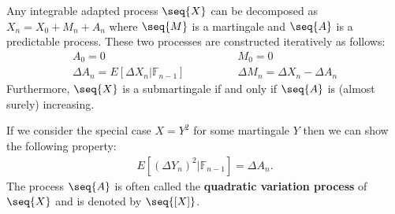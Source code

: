
    \begin{theorem}
        Any integrable adapted process $\seq{X}$ can be decomposed as $X_n=X_0+M_n+A_n$ where $\seq{M}$ is a martingale and $\seq{A}$ is a predictable process. These two processes are constructed iteratively as follows:
        \begin{align}
            A_0 = 0\qquad&\qquad M_0 = 0\\
            \Delta A_n = E[\Delta X_n|\mathbb{F}_{n-1}]\qquad&\qquad\Delta M_n = \Delta X_n - \Delta A_n
        \end{align}
        Furthermore, $\seq{X}$ is a submartingale if and only if $\seq{A}$ is (almost surely) increasing.
    \end{theorem}
    \begin{result}
        If we consider the special case $X=Y^2$ for some martingale $Y$ then we can show the following property:
        \begin{gather}
            E[(\Delta Y_n)^2|\mathbb{F}_{n-1}] = \Delta A_n.
        \end{gather}
        The process $\seq{A}$ is often called the \textbf{quadratic variation process} of $\seq{X}$ and is denoted by $\seq{[X]}$.
    \end{result}

